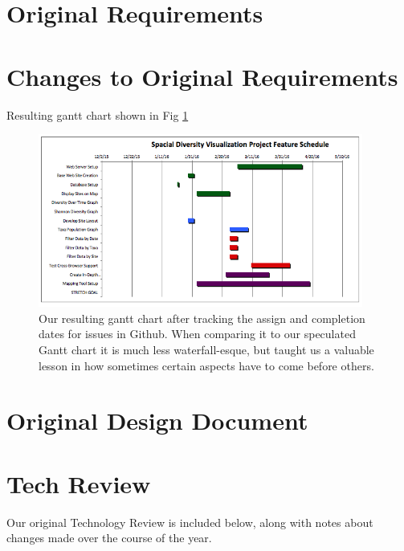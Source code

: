 \documentclass[10pt,draftclsnofoot,onecolumn]{IEEEtran}
\begin{document}
\newpage
\section{Original Requirements} %


\newpage
\section{Changes to Original Requirements} %
Resulting gantt chart shown in Fig \ref{fig:final_gantt}
\begin{figure}[h]
\centering
\includegraphics[width=0.95\textwidth]{FinalGantt.png}
\captionsetup{justification=centering}
\caption{
  Our resulting gantt chart after tracking the assign and completion dates for issues in Github.
  When comparing it to our speculated Gantt chart it is much less waterfall-esque, but taught us a valuable lesson in how sometimes certain aspects have to come before others.
}
\label{fig:final_gantt}
\end{figure}

\newpage
\section{Original Design Document} %


\newpage
\section{Tech Review} %
Our original Technology Review is included below, along with notes about changes made over the course of the year.

\end{document}
